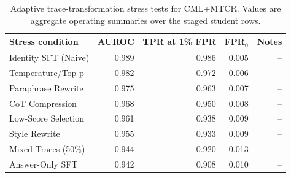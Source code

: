 \begin{table}[!htbp]\centering\footnotesize
\caption{Adaptive trace-transformation stress tests for CML+MTCR. Values are aggregate operating summaries over the staged student rows.}
\label{tab:supp_adaptive_stress}
\begin{tabular}{lrrrr}
\toprule
Stress condition & AUROC & TPR at 1\% FPR & FPR$_0$ & Notes \\
\midrule
Identity SFT (Naive) & 0.989 & 0.986 & 0.005 & -- \\
Temperature/Top-p & 0.982 & 0.972 & 0.006 & -- \\
Paraphrase Rewrite & 0.975 & 0.963 & 0.007 & -- \\
CoT Compression & 0.968 & 0.950 & 0.008 & -- \\
Low-Score Selection & 0.961 & 0.938 & 0.009 & -- \\
Style Rewrite & 0.955 & 0.933 & 0.009 & -- \\
Mixed Traces (50\%) & 0.944 & 0.920 & 0.013 & -- \\
Answer-Only SFT & 0.942 & 0.908 & 0.010 & -- \\
\bottomrule
\end{tabular}
\end{table}

